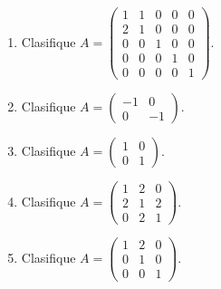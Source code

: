 \documentclass[12pt]{article}
\theoremstyle{remark}
\newcounter{contadorEjercicio}
\newenvironment{listaejercicios}{\begin{enumerate}[label=\textbf{E\arabic*.},leftmargin=2.4em,itemsep=0.52em]\setcounter{enumi}{\value{contadorEjercicio}}}{\setcounter{contadorEjercicio}{\value{enumi}}\end{enumerate}}
\begin{document}
\begin{listaejercicios}
\item Clasifique $A=\begin{pmatrix}1&1&0&0&0\\2&1&0&0&0\\0&0&1&0&0\\0&0&0&1&0\\0&0&0&0&1\end{pmatrix}$.

\item Clasifique $A=\begin{pmatrix}-1&0\\0&-1\end{pmatrix}$.

\item Clasifique $A=\begin{pmatrix}1&0\\0&1\end{pmatrix}$.

\item Clasifique $A=\begin{pmatrix}1&2&0\\2&1&2\\0&2&1\end{pmatrix}$.

\item Clasifique $A=\begin{pmatrix}1&2&0\\0&1&0\\0&0&1\end{pmatrix}$.

\end{listaejercicios}
\end{document}
